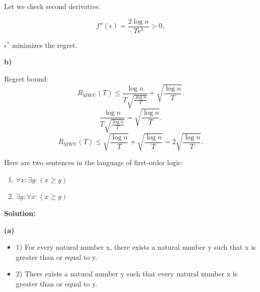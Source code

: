 \documentclass[10pt,a4paper]{exam}
\begin{document}
\begin{questions}
Let we check second derivative.

\[
f''(\epsilon)=\frac{2\log n}{T\epsilon^3}>0,
\]

$\epsilon^*$ minimizes the regret.

\textbf{b)}

Regret bound:
\[
R_{\mathrm{MWU}}(T)
\leq
\frac{\log n}{T\sqrt{\frac{\log n}{T}}}
+
\sqrt{\frac{\log n}{T}}.
\]
\[
\frac{\log n}{T\sqrt{\frac{\log n}{T}}}
=
\sqrt{\frac{\log n}{T}}.
\]
\[
R_{\mathrm{MWU}}(T)
\leq
\sqrt{\frac{\log n}{T}}
+
\sqrt{\frac{\log n}{T}}
=
2\sqrt{\frac{\log n}{T}}.
\]

\newpage

\question[25]
Here are two sentences in the language of first-order logic:
\begin{enumerate}[(1)]
    \item $\forall x : \exists y : (x \geq y)$
    \item $\exists y : \forall x : (x \geq y)$
\end{enumerate}


\textbf{Solution:}

\textbf{(a)}
\begin{itemize}
    \item 1) For every natural number x, there exists a natural number y such that x is greater than or equal to y.
    \item 2) There exists a natural number y such that every natural number x is greater than or equal to y.
\end{itemize}


\end{questions}
\end{document}
